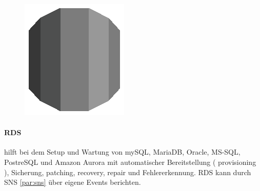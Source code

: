 \documentclass[
12pt,
english,
ngerman,
headsepline,
twoside,
openright,
numbers=noenddot,version=first
]{scrreprt}
\begin{document}
\begin{figure}
	\includegraphics[width=0.9\linewidth]{./pics/aws/Database_GRAYSCALE_AmazonRDS.eps}
\end{figure}
\paragraph{\acrfull{RDS}} hilft bei dem Setup und Wartung von mySQL, MariaDB, Oracle, MS-SQL, PostreSQL und Amazon Aurora mit automatischer Bereitstellung ( provisioning ), Sicherung, patching, recovery, repair und Fehlererkennung. \acrshort{RDS} kann durch \acrshort{SNS} \autoref{par:sns} über eigene Events berichten.
\end{document}
